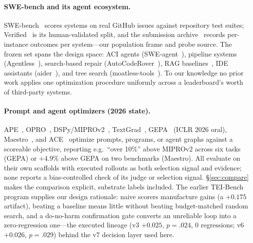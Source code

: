 \documentclass[11pt]{article}
\begin{document}
\paragraph{SWE-bench and its agent ecosystem.}
SWE-bench~\citep{swebench2024} scores systems on real GitHub issues against
repository test suites; Verified~\citep{swebenchverified2024} is its
human-validated split, and the submission archive~\citep{swebenchexperiments}
records per-instance outcomes per system---our population frame and probe
source. The frozen set spans the design space: ACI agents
(SWE-agent~\citep{sweagent2024}), pipeline systems
(Agentless~\citep{agentless2024}), search-based repair
(AutoCodeRover~\citep{autocoderover2024}), RAG baselines~\citep{swebench2024},
IDE assistants (aider~\citep{aider}), and tree search
(moatless-tools~\citep{moatless}). To our knowledge no prior work applies one
optimization procedure uniformly across a leaderboard's worth of third-party
systems.

\paragraph{Prompt and agent optimizers (2026 state).}
APE~\citep{ape2022}, OPRO~\citep{opro2023}, DSPy/MIPROv2~\citep{dspy2023,
mipro2024}, TextGrad~\citep{textgrad2024}, GEPA~\citep{gepa2025} (ICLR 2026
oral), Maestro~\citep{maestro2025}, and ACE~\citep{ace2026} optimize prompts,
programs, or agent graphs against a scoreable objective, reporting e.g.\
``over 10\%'' above MIPROv2 across six tasks (GEPA) or $+4.9\%$ above GEPA on
two benchmarks (Maestro). All evaluate on their own scaffolds with executed
rollouts as both selection signal and evidence; none reports a bias-controlled
check of its judge or selection signal. \S\ref{sec:compare} makes the
comparison explicit, substrate labels included. The earlier TEI-Bench program
supplies our design rationale: naive scorers manufacture gains (a $+0.175$
artifact), beating a baseline means little without beating budget-matched
random search, and a do-no-harm confirmation gate converts an unreliable loop
into a zero-regression one---the executed lineage (v3 $+0.025$, $p{=}.024$,
0 regressions; v6 $+0.026$, $p{=}.029$) behind the v7 decision layer used
here.
\end{document}
